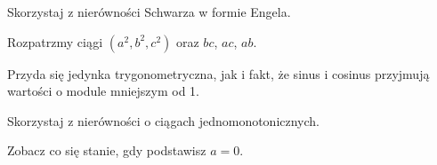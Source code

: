 
\begin{hints_list}
	\item Skorzystaj z nierówności Schwarza w formie Engela.
	\item Rozpatrzmy ciągi $(a^2, b^2, c^2)$ oraz $bc$, $ac$, $ab$.
	\item Przyda się jedynka trygonometryczna, jak i fakt, że sinus i cosinus przyjmują wartości o module mniejszym od 1.
	\item Skorzystaj z nierówności o ciągach jednomonotonicznych.
	\item Zobacz co się stanie, gdy podstawisz $a = 0$.
\end{hints_list}